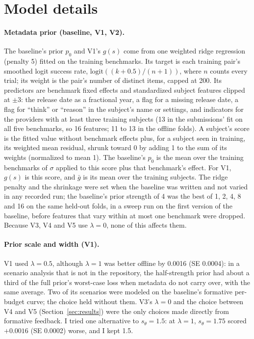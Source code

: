 \section{Model details}\label{app:model}

\paragraph{Metadata prior (baseline, V1, V2).}
The baseline's prior $p_0$ and V1's $g(s)$ come from one weighted ridge regression (penalty 5) fitted on the training benchmarks. Its target is each training pair's smoothed logit success rate, $\mathrm{logit}((k + 0.5)/(n + 1))$, where $n$ counts every trial; its weight is the pair's number of distinct items, capped at 200. Its predictors are benchmark fixed effects and standardized subject features clipped at $\pm 3$: the release date as a fractional year, a flag for a missing release date, a flag for ``think'' or ``reason'' in the subject's name or settings, and indicators for the providers with at least three training subjects (13 in the submissions' fit on all five benchmarks, so 16 features; 11 to 13 in the offline folds). A subject's score is the fitted value without benchmark effects plus, for a subject seen in training, its weighted mean residual, shrunk toward 0 by adding 1 to the sum of its weights (normalized to mean 1). The baseline's $p_0$ is the mean over the training benchmarks of $\sigma$ applied to this score plus that benchmark's effect. For V1, $g(s)$ is this score, and $\bar g$ is its mean over the training subjects. The ridge penalty and the shrinkage were set when the baseline was written and not varied in any recorded run; the baseline's prior strength of 4 was the best of 1, 2, 4, 8 and 16 on the same held-out folds, in a sweep run on the first version of the baseline, before features that vary within at most one benchmark were dropped. Because V3, V4 and V5 use $\lambda = 0$, none of this affects them.

\paragraph{Prior scale and width (V1).}
V1 used $\lambda = 0.5$, although $\lambda = 1$ was better offline by 0.0016 (SE 0.0004): in a scenario analysis that is not in the repository, the half-strength prior had about a third of the full prior's worst-case loss when metadata do not carry over, with the same average. Two of its scenarios were modeled on the baseline's formative per-budget curve; the choice held without them. V3's $\lambda = 0$ and the choice between V4 and V5 (Section~\ref{sec:results}) were the only choices made directly from formative feedback. I tried one alternative to $s_\theta = 1.5$: at $\lambda = 1$, $s_\theta = 1.75$ scored $+0.0016$ (SE 0.0002) worse, and I kept 1.5.

